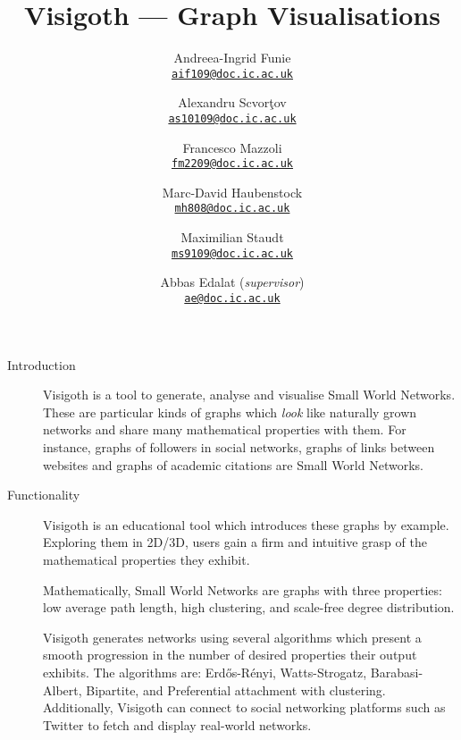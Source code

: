 \documentclass[a4paper,11pt]{article}
\let\stdhref\href
\renewcommand{\href}[2]{\stdhref{#1}{\texttt{#2}}}
\newcommand{\mailto}[1]{\href{mailto:#1}{#1}}
\begin{document}
\title{Visigoth --- Graph Visualisations}
\author{
  Andreea-Ingrid Funie\\\mailto{aif109@doc.ic.ac.uk}\and
  Alexandru Scvor\c tov\\\mailto{as10109@doc.ic.ac.uk}\and
  Francesco Mazzoli\\\mailto{fm2209@doc.ic.ac.uk}\and
  Marc-David Haubenstock\\\mailto{mh808@doc.ic.ac.uk}\and
  Maximilian Staudt\\\mailto{ms9109@doc.ic.ac.uk}
}
\date{Abbas Edalat (\emph{supervisor})\\\mailto{ae@doc.ic.ac.uk}}
\maketitle

\begin{description}
\item[Introduction]

  Visigoth is a tool to generate, analyse and visualise Small World
  Networks. These are particular kinds of graphs which \emph{look}
  like naturally grown networks and share many mathematical properties
  with them.  For instance, graphs of followers in social networks,
  graphs of links between websites and graphs of academic citations
  are Small World Networks.

  \item[Functionality]

  Visigoth is an educational tool which introduces these graphs by
  example.  Exploring them in 2D/3D, users gain a firm and intuitive
  grasp of the mathematical properties they exhibit.

  Mathematically, Small World Networks are graphs with three
  properties: low average path length, high clustering, and scale-free
  degree distribution.

  Visigoth generates networks using several algorithms which present a
  smooth progression in the number of desired properties their output
  exhibits. The algorithms are: Erd\H{o}s-R\'{e}nyi, Watts-Strogatz,
  Barabasi-Albert, Bipartite, and Preferential attachment with
  clustering. Additionally, Visigoth can connect to social networking
  platforms such as Twitter to fetch and display real-world networks.


\end{description}
\end{document}
